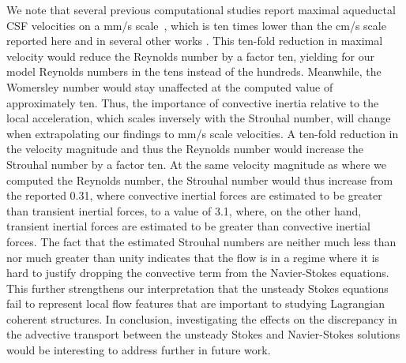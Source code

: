 \documentclass{template}
\begin{document}
We note that several previous computational studies report maximal aqueductal
CSF velocities on a mm/s scale~\citep{enzmann1993cerebrospinal, enzmann1991normal,
Causemann2022HumanFramework, Sweetman2011ThreeDimensional, howden2008three, wagshul2011pulsating,
greitz1993pulsatile, sweetman2011cerebrospinal}, which is ten times lower than the
cm/s scale reported here and in several other works
\citep{kim1999quantitative, nitz1992flow, Kurtcuoglu2007ComputationalSylvius}. 
This ten-fold reduction in maximal velocity would reduce the Reynolds number
by a factor ten, yielding for our model Reynolds numbers in the tens instead of the hundreds.
Meanwhile, the Womersley number would stay unaffected at the computed value of approximately ten.
Thus, the importance of convective inertia relative to the local acceleration,
which scales inversely with the Strouhal number,
will change when extrapolating our findings to mm/s scale velocities.
A ten-fold reduction in the velocity magnitude and thus the Reynolds number
would increase the Strouhal number by a factor ten.
At the same velocity magnitude as where we computed the Reynolds number, the Strouhal number
would thus increase from the reported 0.31, where convective inertial forces are estimated to be greater than
transient inertial forces, to a value of 3.1, where, on the other hand, transient inertial forces are estimated
to be greater than convective inertial forces. The fact that the estimated Strouhal numbers
are neither much less than nor much greater than unity indicates that the flow is in a regime
where it is hard to justify dropping the convective term from the Navier-Stokes equations.
This further strengthens our interpretation that the unsteady Stokes equations fail
to represent local flow features that are important to studying Lagrangian coherent structures.
In conclusion, investigating the effects on the discrepancy in the advective transport
between the unsteady Stokes and Navier-Stokes solutions would be interesting to address further in future work.
\end{document}
